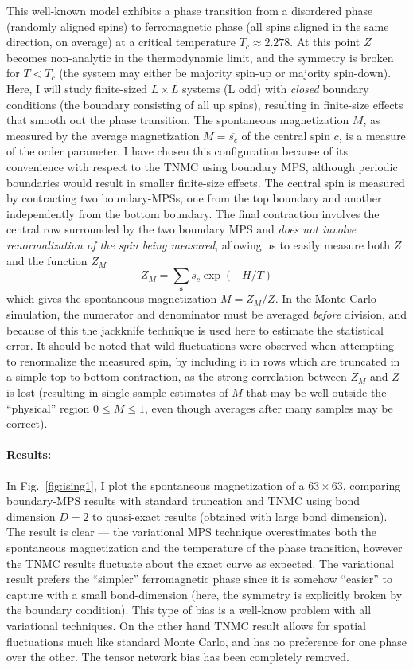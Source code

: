 \documentclass[aps,prl,nopacs,twocolumn]{revtex4}
\begin{document}
This well-known model exhibits a phase transition from a disordered phase (randomly aligned spins) to ferromagnetic phase (all spins aligned in the same direction, on average) at a critical temperature $T_c\approx 2.278$. At this point $Z$ becomes non-analytic in the thermodynamic limit, and the symmetry is broken for $T<T_c$ (the system may either be majority spin-up or majority spin-down). Here, I will study finite-sized $L\times L$ systems (L odd) with \emph{closed} boundary conditions (the boundary consisting of all up spins), resulting in finite-size effects that smooth out the phase transition. The spontaneous magnetization $M$, as measured by the average magnetization $M =\overline{s_c}$ of the central spin $c$, is a measure of the order parameter. I have chosen this configuration because of its convenience with respect to the TNMC using boundary MPS, although periodic boundaries would result in smaller finite-size effects. The central spin is measured by contracting two boundary-MPSs, one from the top boundary and another independently from the bottom boundary. The final contraction involves the central row surrounded by the two boundary MPS and \emph{does not involve renormalization of the spin being measured}, allowing us to easily measure both $Z$ and the function $Z_M$
\begin{equation}
    Z_M = \sum_{\mathbf{s}} s_c \exp{(-H/T)}
\end{equation} 
which gives the spontaneous magnetization $M = Z_M / Z$. In the Monte Carlo simulation, the numerator and denominator must be averaged \emph{before} division, and because of this the jackknife technique is used here to estimate the statistical error. It should be noted that wild fluctuations were observed when attempting to renormalize the measured spin, by including it in rows which are truncated in a simple top-to-bottom contraction, as the strong correlation between $Z_M$ and $Z$ is lost (resulting in single-sample estimates of $M$ that may be well outside the ``physical'' region $0 \le M \le 1$, even though averages after many samples may be correct).

\paragraph{Results: } In Fig.~\ref{fig:ising1}, I plot the spontaneous magnetization of a $63\times63$, comparing boundary-MPS results with standard truncation and TNMC using bond dimension $D=2$ to quasi-exact results (obtained with large bond dimension). The result is clear --- the variational MPS technique overestimates both the spontaneous magnetization and the temperature of the phase transition, however the TNMC results fluctuate about the exact curve as expected. The variational result prefers the ``simpler'' ferromagnetic phase since it is somehow ``easier'' to capture with a small bond-dimension (here, the symmetry is explicitly broken by the boundary condition). This type of bias is a well-know problem with all variational techniques. On the other hand TNMC result allows for spatial fluctuations much like standard Monte Carlo, and has no preference for one phase over the other. The tensor network bias has been completely removed.
\end{document}
